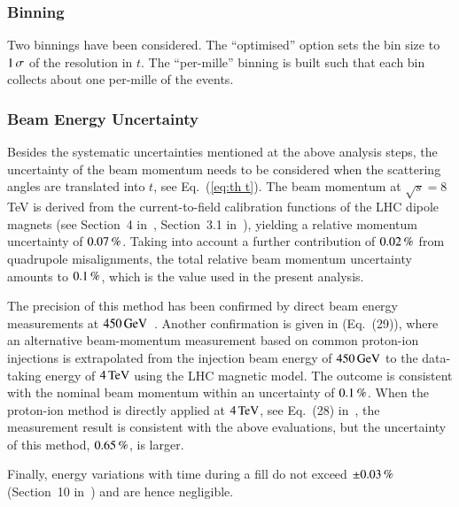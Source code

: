 \subsubsection{Binning}
\label{sec:binning}

Two binnings have been considered. The ``optimised'' option sets the bin size to $1\,{\rm \sigma}$ of the resolution in $t$. The ``per-mille'' binning is built such that each bin collects about one per-mille of the events.



\subsubsection{Beam Energy Uncertainty}
\label{sec:beam en unc}

Besides the systematic uncertainties mentioned at the above analysis steps, the uncertainty of the beam momentum needs to be considered when the scattering angles are translated into $t$, see Eq.~(\ref{eq:th t}). The beam momentum at 
$\sqrt{s}=8\,$TeV is derived from the current-to-field calibration functions of the LHC dipole magnets (see Section~4 in~\cite{lhc-note-334}, Section~3.1 in~\cite{cern-ats-2013-040}), yielding a relative momentum uncertainty of $0.07\,{\rm \%}$. Taking into account a further contribution of $0.02\,{\rm \%}$ from quadrupole misalignments, the total relative beam momentum uncertainty amounts to $0.1\,{\rm \%}$, which is the value used in the present analysis.

The precision of this method has been confirmed by direct beam energy measurements at $450\,{\rm GeV}$~\cite{bottura-pac09,fidel}.
Another confirmation is given in \cite{cern-ats-2013-040} (Eq.~(29)), where an alternative beam-momentum measurement based on common proton-ion injections is extrapolated from the injection beam energy of $450\,{\rm GeV}$ to the data-taking energy of $4\,{\rm TeV}$ using the LHC magnetic model. The outcome is consistent with the nominal beam momentum within an uncertainty of $0.1\,{\rm \%}$. When the proton-ion method is directly applied at $4\,{\rm TeV}$, see Eq.~(28) in~\cite{cern-ats-2013-040}, the measurement result is consistent with the above evaluations, but the uncertainty of this method, $0.65\,{\rm \%}$, is larger. 

Finally, energy variations with time during a fill do not exceed $\pm 0.03\,{\rm \%}$ (Section~10 in~\cite{cern-ats-2013-040}) and are hence negligible.


